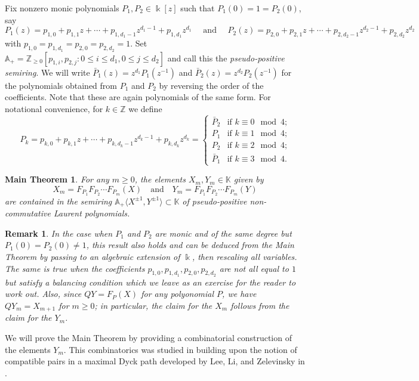 \documentclass{amsart}
\newtheorem*{maintheorem}{Main Theorem}
\newtheorem*{remark*}{Remark}
\newcommand{\kk}{\Bbbk}
\renewcommand{\AA}{\mathbb{A}}
\newcommand{\KK}{\mathbb{K}}
\newcommand{\ZZ}{\mathbb{Z}}
\begin{document}
Fix nonzero monic polynomials $P_1,P_2\in\kk[z]$ such that $P_1(0)=1=P_2(0)$, say
\[P_1(z)=p_{1,0}+p_{1,1}z+\cdots+p_{1,d_1-1}z^{d_1-1}+p_{1,d_1}z^{d_1}\quad\!\text{ and }\!\quad P_2(z)=p_{2,0}+p_{2,1}z+\cdots+p_{2,d_2-1}z^{d_2-1}+p_{2,d_2}z^{d_2}\]
with $p_{1,0}=p_{1,d_1}=p_{2,0}=p_{2,d_2}=1$.  Set $\AA_+=\ZZ_{\ge0}[p_{1,i},p_{2,j}:0\le i\le d_1,0\le j\le d_2]$ and call this the \emph{pseudo-positive semiring}.  We will write $\bar{P}_1(z)=z^{d_1}P_1(z^{-1})$ and $\bar{P}_2(z)=z^{d_2}P_2(z^{-1})$ for the polynomials obtained from $P_1$ and $P_2$ by reversing the order of the coefficients.  Note that these are again polynomials of the same form.  For notational convenience, for $k\in\ZZ$ we define 
\[P_k=p_{k,0}+p_{k,1}z+\cdots+p_{k,d_k-1}z^{d_k-1}+p_{k,d_k}z^{d_k}=\begin{cases}\bar{P}_2 & \text{if $k\equiv 0\mod 4$;}\\P_1 & \text{if $k\equiv 1\mod 4$;}\\P_2 & \text{if $k\equiv 2\mod 4$;}\\\bar{P}_1 & \text{if $k\equiv 3\mod 4$.}\end{cases}\]
\begin{maintheorem}\label{th:main}
 For any $m\ge0$, the elements $ X_m, Y_m\in\KK$ given by
 \[ X_m=F_{P_1}F_{P_2}\cdots F_{P_m}(X)\quad\text{and}\quad  Y_m=F_{P_1}F_{P_2}\cdots F_{P_m}(Y)\]
 are contained in the semiring $\AA_+\langle X^{\pm1},Y^{\pm1}\rangle\subset\KK$ of pseudo-positive non-commutative Laurent polynomials.
\end{maintheorem}
\begin{remark*}
 In the case when $P_1$ and $P_2$ are monic and of the same degree but $P_1(0)=P_2(0)\ne1$, this result also holds and can be deduced from the Main Theorem by passing to an algebraic extension of $\kk$, then rescaling all variables.  The same is true when the coefficients $p_{1,0},p_{1,d_1},p_{2,0},p_{2,d_2}$ are not all equal to $1$ but satisfy a balancing condition which we leave as an exercise for the reader to work out.  Also, since $QY=F_P(X)$ for any polyonomial $P$, we have $ QY_m=X_{m+1}$ for $m\ge0$; in particular, the claim for the $X_m$ follows from the claim for the $Y_m$.
\end{remark*}

We will prove the Main Theorem by providing a combinatorial construction of the elements $Y_m$.  This combinatorics was studied in \cite{rupel2} building upon the notion of compatible pairs in a maximal Dyck path developed by Lee, Li, and Zelevinsky in \cite{lee-li-zelevinsky}.
\end{document}

